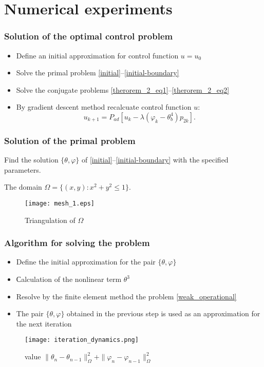 \documentclass[9pt]{beamer}
\begin{document}
\section{Numerical experiments}
\begin{frame}
    \frametitle{Solution of the optimal control problem}
    \begin{itemize}
        \item Define an initial approximation for control function $u = u_0$
        \item Solve the primal problem \eqref{initial}--\eqref{initial-boundary}
        \item Solve the conjugate problems \eqref{therorem_2_eq1}--\eqref{therorem_2_eq2}
        \item By gradient descent method recalcuate control function $u$:
        $$u_{k+1} = P_{ad}\left[ u_k - \lambda (\varphi_k - \theta_b^4)p_{2k} \right].$$
    \end{itemize}
\end{frame}

\begin{frame}
\frametitle{Solution of the primal problem}
Find the solution $\{\theta, \varphi\}$ of \eqref{initial}--\eqref{initial-boundary} with the specified parameters.

The domain $\Omega = \{(x,y):x^2+y^2 \le 1\}$.
\begin{figure}[H]
    \centering
    \texttt{[image: mesh\_1.eps]}
    \caption{Triangulation of $\Omega$}
\end{figure}

\end{frame}
\begin{frame}
\frametitle{Algorithm for solving the problem}
    \begin{itemize}
        \item Define the initial approximation for the pair $\{\theta, \varphi\}$
        \item Сalculation of the nonlinear term $\theta^3$
        \item Resolve by the finite element method the problem \eqref{weak_operational}
        \item The pair $\{\theta, \varphi\}$  obtained in the previous step is used as an approximation for the next iteration
    \end{itemize}
    \begin{figure}[H]
        \centering
        \texttt{[image: iteration\_dynamics.png]}
        \caption{value $\|\theta_n - \theta_{n-1}\|_\Omega^2 + \|\varphi_n - \varphi_{n-1}\|_\Omega^2$}
    \end{figure}

\end{frame}
\end{document}
